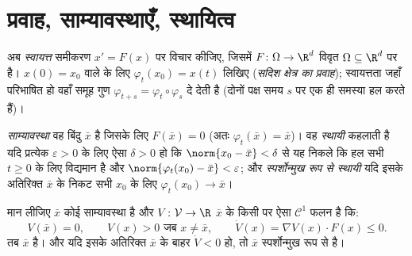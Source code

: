 \section{प्रवाह, साम्यावस्थाएँ, स्थायित्व}

अब \emph{स्वायत्त} समीकरण $x' = F(x)$ पर विचार कीजिए, जिसमें $F
\colon \Omega \to \R^d$
विवृत $\Omega
\subseteq \R^d$ पर  है। $x(0) = x_0$ वाले  के लिए
$\varphi_t(x_0) = x(t)$ लिखिए (\emph{सदिश क्षेत्र का प्रवाह}); स्वायत्तता जहाँ परिभाषित हो वहाँ समूह गुण $\varphi_{t+s} =
\varphi_t\circ\varphi_s$ दे देती
है (दोनों पक्ष समय $s$ पर एक ही समस्या हल करते हैं)।

\begin{definition}\label{def:b3:ode:stability}
\emph{साम्यावस्था} वह बिंदु $\bar x$ है जिसके लिए $F(\bar x) =
0$ (अतः $\varphi_t(\bar x) = \bar x$)।
वह \emph{स्थायी} कहलाती है यदि
प्रत्येक $\varepsilon > 0$ के लिए ऐसा $\delta > 0$ हो कि $\norm{x_0 - \bar x} < \delta$ से यह निकले कि हल सभी
$t \geq 0$ के लिए विद्यमान है और $\norm{\varphi_t(x_0) - \bar
x} < \varepsilon$; और \emph{स्पर्शोन्मुख रूप से
स्थायी} यदि इसके अतिरिक्त $\bar x$ के निकट सभी $x_0$ के लिए $\varphi_t(x_0) \to \bar x$।
\end{definition}

\begin{theorem}[ल्यापुनोव फलन]\label{thm:b3:ode:lyapunov}
मान लीजिए $\bar x$ कोई साम्यावस्था है और $V \colon \mathcal V \to
\R$ $\bar x$ के किसी
 पर ऐसा $\mathcal C^1$ फलन है कि:
\[
V(\bar x) = 0,\qquad V(x) > 0 \text{ जब } x \neq \bar x,
\qquad \dot V(x) = \nabla V(x)\cdot F(x) \leq 0 .
\]
तब $\bar x$  है। और यदि इसके अतिरिक्त $\bar
x$ के बाहर $\dot V < 0$ हो,
तो $\bar x$ स्पर्शोन्मुख रूप से  है।
\end{theorem}

